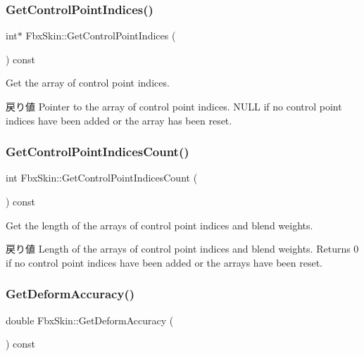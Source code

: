 \subsubsection{\texorpdfstring{Get\+Control\+Point\+Indices()}{GetControlPointIndices()}}
{\footnotesize\ttfamily int$\ast$ Fbx\+Skin\+::\+Get\+Control\+Point\+Indices (\begin{DoxyParamCaption}{ }\end{DoxyParamCaption}) const}

Get the array of control point indices. \begin{DoxyReturn}{戻り値}
Pointer to the array of control point indices. {\ttfamily N\+U\+LL} if no control point indices have been added or the array has been reset. 
\end{DoxyReturn}
\mbox{\label{class_fbx_skin_ae1a338502f7f4d466d83712eb7750ac8}} 
\subsubsection{\texorpdfstring{Get\+Control\+Point\+Indices\+Count()}{GetControlPointIndicesCount()}}
{\footnotesize\ttfamily int Fbx\+Skin\+::\+Get\+Control\+Point\+Indices\+Count (\begin{DoxyParamCaption}{ }\end{DoxyParamCaption}) const}

Get the length of the arrays of control point indices and blend weights. \begin{DoxyReturn}{戻り値}
Length of the arrays of control point indices and blend weights. Returns 0 if no control point indices have been added or the arrays have been reset. 
\end{DoxyReturn}
\mbox{\label{class_fbx_skin_a1ac9a16df81616b1bee678cd3507e941}} 
\subsubsection{\texorpdfstring{Get\+Deform\+Accuracy()}{GetDeformAccuracy()}}
{\footnotesize\ttfamily double Fbx\+Skin\+::\+Get\+Deform\+Accuracy (\begin{DoxyParamCaption}{ }\end{DoxyParamCaption}) const}


